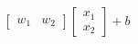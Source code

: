 \documentclass[preview]{standalone}
\begin{document}
\begin{align*}
\begin{bmatrix} w_1 & w_2 \end{bmatrix} \begin{bmatrix} x_1 \\ x_2 \end{bmatrix} + b
\end{align*}
\end{document}
